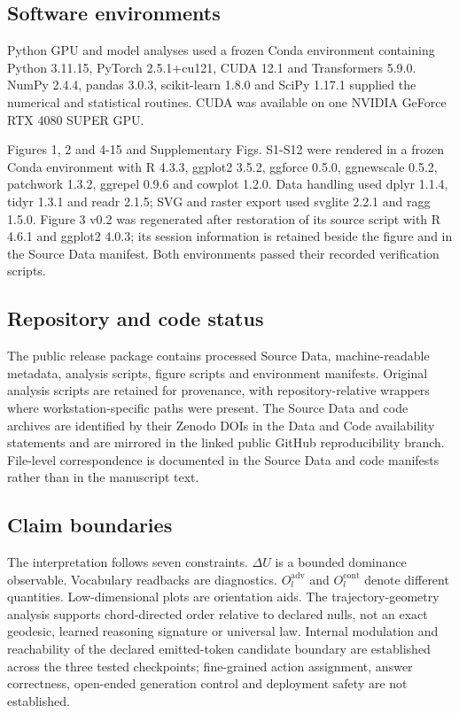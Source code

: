 \documentclass[11pt]{article}
\begin{document}
\subsection*{Software environments}
Python GPU and model analyses used a frozen Conda environment containing Python 3.11.15, PyTorch 2.5.1+cu121, CUDA 12.1 and Transformers 5.9.0. NumPy 2.4.4, pandas 3.0.3, scikit-learn 1.8.0 and SciPy 1.17.1 supplied the numerical and statistical routines. CUDA was available on one NVIDIA GeForce RTX 4080 SUPER GPU.

Figures 1, 2 and 4-15 and Supplementary Figs. S1-S12 were rendered in a frozen Conda environment with R 4.3.3, ggplot2 3.5.2, ggforce 0.5.0, ggnewscale 0.5.2, patchwork 1.3.2, ggrepel 0.9.6 and cowplot 1.2.0. Data handling used dplyr 1.1.4, tidyr 1.3.1 and readr 2.1.5; SVG and raster export used svglite 2.2.1 and ragg 1.5.0. Figure 3 v0.2 was regenerated after restoration of its source script with R 4.6.1 and ggplot2 4.0.3; its session information is retained beside the figure and in the Source Data manifest. Both environments passed their recorded verification scripts.

\subsection*{Repository and code status}
The public release package contains processed Source Data, machine-readable metadata, analysis scripts, figure scripts and environment manifests. Original analysis scripts are retained for provenance, with repository-relative wrappers where workstation-specific paths were present. The Source Data and code archives are identified by their Zenodo DOIs in the Data and Code availability statements and are mirrored in the linked public GitHub reproducibility branch. File-level correspondence is documented in the Source Data and code manifests rather than in the manuscript text.

\subsection*{Claim boundaries}
The interpretation follows seven constraints. \(\Delta U\) is a bounded dominance observable. Vocabulary readbacks are diagnostics. \(O_l^{\mathrm{adv}}\) and \(O_l^{\mathrm{cont}}\) denote different quantities. Low-dimensional plots are orientation aids. The trajectory-geometry analysis supports chord-directed order relative to declared nulls, not an exact geodesic, learned reasoning signature or universal law. Internal modulation and reachability of the declared emitted-token candidate boundary are established across the three tested checkpoints; fine-grained action assignment, answer correctness, open-ended generation control and deployment safety are not established.
\end{document}
